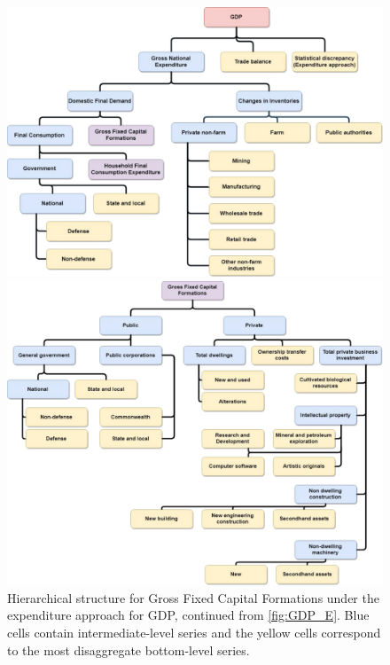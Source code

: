\documentclass[graybox]{svmult}
\begin{document}
\begin{figure}
	\centering	\includegraphics[width=.9\textwidth]{Figs/Hierarchical-structures/ExpenditureApproach.pdf}
	\caption{Hierarchical structure of the expenditure approach for GDP\@. The pink cell contains GDP, the most aggregate series. The blue and purple cells contain intermediate-level series with the series in the purple cells further disaggregated in Figures~\ref{fig:GFCF} and~\ref{fig:HFCE}. The yellow cells contain the most disaggregate bottom-level series.}\label{fig:GDP_E}
%
	\centering
	\includegraphics[width=.9\textwidth]{Figs/Hierarchical-structures/GFCF.pdf}
	\caption{Hierarchical structure for Gross Fixed Capital Formations under the expenditure approach for GDP, continued from \autoref{fig:GDP_E}. Blue cells contain intermediate-level series and the yellow cells correspond to the most disaggregate bottom-level series.}\label{fig:GFCF}
\end{figure}
\end{document}
